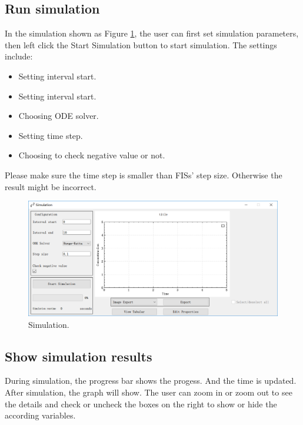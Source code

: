 \documentclass[journal,a4paper,onecolumn]{article}
\begin{document}
\subsection{Run simulation}
In the simulation shown as Figure \ref{fig:Simulation}, the user can first set simulation parameters, then left click the Start Simulation button to start simulation. The settings include:
\begin{itemize}
	\item Setting interval start.
	\item Setting interval start.
	\item Choosing ODE solver.
	\item Setting time step.
	\item Choosing to check negative value or not.
\end{itemize}

Please make sure the time step is smaller than FISs' step size. Otherwise the result might be incorrect.

\begin{figure}[!hbt]
	\begin{center}
		\includegraphics[width=\columnwidth]{fig13}
		\caption{Simulation.}
		\label{fig:Simulation}
	\end{center}
\end{figure}
\subsection{Show simulation results}
During simulation, the progress bar shows the progess. And the time is updated. After simulation, the graph will show. The user can zoom in or zoom out to see the details and check or uncheck the boxes on the right to show or hide the according variables.
\end{document}
